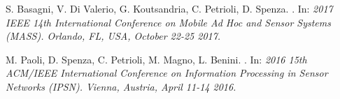 \documentclass[binding=0.6cm,TFA]{sapthesis}
\begin{document}
\begin{thebibliography}{9}
    S. Basagni, V. Di Valerio, G. Koutsandria, C. Petrioli, D. Spenza.
    .
    In: \textit{2017 IEEE 14th International Conference on Mobile Ad Hoc and Sensor Systems (MASS). Orlando, FL, USA, October 22-25 2017.}

    M. Paoli, D. Spenza, C. Petrioli, M. Magno, L. Benini.
    .
    In: \textit{2016 15th ACM/IEEE International Conference on Information Processing in Sensor Networks (IPSN). Vienna, Austria, April 11-14 2016.}

\end{thebibliography}
\end{document}
